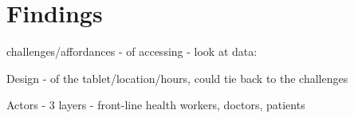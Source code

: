 \section{Findings}
\begin{comment}
This will form the chunk of your writing. I have sometimes iterated through these in written form, or else made a rough outline  on paper and then put it down. It is best that we talk about this section before you attempt to write. Depending on the structure of this section, you might label the section Findings or Analysis. The thing to remember is that all of your data goes into this section, and you need to weave a story around your data that is compelling, novel, and forms the central theme of the paper. If you have done qualitative work, make sure you include these quotes in the findings. Most importantly, do not tell a story based on quotes you have. Pick quotes based on the story you want to tell. 
\end{comment}

\textcolor{red}{}
challenges/affordances - of accessing - look at data:

Design - of the tablet/location/hours, could tie back to the challenges

Actors - 3 layers - front-line health workers, doctors, patients

